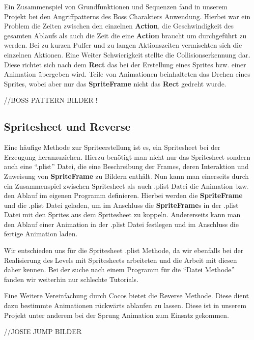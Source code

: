 Ein Zusammenspiel von Grundfunktionen und Sequenzen fand in unserem Projekt bei den Angriffpatterns des Boss Charakters Anwendung. Hierbei war ein Problem die Zeiten zwischen den einzelnen \textbf{Action}, die Geschwindigkeit des gesamten Ablaufs als auch die Zeit die eine \textbf{Action} braucht um durchgeführt zu werden. Bei zu kurzen Puffer und zu langen Aktionszeiten vermischten sich die einzelnen Aktionen. Eine Weiter Schwierigkeit stellte die Collisionserkennung dar. Diese richtet sich nach dem \textbf{Rect} das bei der Erstellung eines Sprites bzw. einer Animation übergeben wird.  Teile von Animationen beinhalteten das Drehen eines Sprites, wobei aber nur das \textbf{SpriteFrame} nicht das \textbf{Rect} gedreht wurde. 


//BOSS PATTERN BILDER !



\subsection{Spritesheet und Reverse}

Eine häufige Methode zur Spriteerstellung ist es, ein Spritesheet bei der Erzeugung heranzuziehen. 
Hierzu benötigt man nicht nur das Spritesheet sondern auch eine “.plist” Datei, die eine Beschreibung der Frames, deren Interaktion und Zuweisung von \textbf{SpriteFrame} zu Bildern enthält. Nun kann man einerseits durch ein Zusammenspiel zwischen Spritesheet als auch .plist Datei die Animation bzw. den Ablauf im eigenen Programm definieren. Hierbei werden die \textbf{SpriteFrame} und die .plist Datei geladen, um im Anschluss die \textbf{SpriteFrame}s in der .plist Datei mit den Sprites aus dem Spritesheet zu koppeln. Andererseits kann man den Ablauf einer Animation in der .plist Datei festlegen und im Anschluss die fertige Animation laden. 

Wir entschieden uns für die Spritesheet .plist Methode, da wir ebenfalls bei der Realisierung des Levels mit Spritesheets arbeiteten und die Arbeit mit diesen daher kennen. Bei der suche nach einem Programm für die “Datei Methode” fanden wir weiterhin nur schlechte Tutorials. 

Eine Weitere Vereinfachung durch Cocos bietet die Reverse Methode. Diese dient dazu bestimmte Animationen rückwärts ablaufen zu lassen. Diese ist in unserem Projekt unter anderem bei der Sprung Animation zum Einsatz gekommen. 

//JOSIE JUMP BILDER



